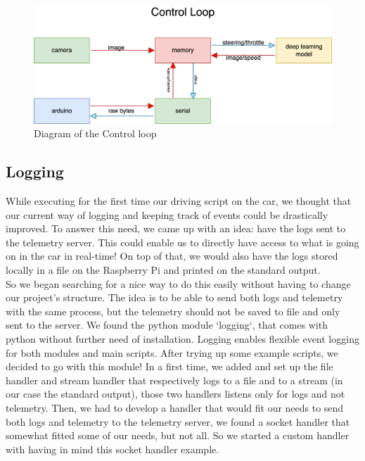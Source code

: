 \documentclass[12pt]{article}
\begin{document}
\begin{figure}[h!]
    \includegraphics[width=\textwidth]{../../docs/control-loop.png}
    \caption{Diagram of the Control loop}
    \label{fig:control-loop}
\end{figure}

\subsection{Logging}
While executing for the first time our driving script on the car, we thought that our current way of logging and keeping track of events could be drastically improved. To answer this need, we came up with an idea: have the logs sent to the telemetry server. This could enable us to directly have access to what is going on in the car in real-time! On top of that, we would also have the logs stored locally in a file on the Raspberry Pi and printed on the standard output. \\  

So we began searching for a nice way to do this easily without having to change our project's structure. The idea is to be able to send both logs and telemetry with the same process, but the telemetry should not be saved to file and only sent to the server. We found the python module `logging`, that comes with python without further need of installation. Logging enables flexible event logging for both modules and main scripts. After trying up some example scripts, we decided to go with this module! In a first time, we added and set up the file handler and stream handler that respectively logs to a file and to a stream (in our case the standard output), those two handlers listens only for logs and not telemetry. Then, we had to develop a handler that would fit our needs to send both logs and telemetry to the telemetry server, we found a socket handler that somewhat fitted some of our needs, but not all. So we started a custom handler with having in mind this socket handler example. \\
\end{document}
